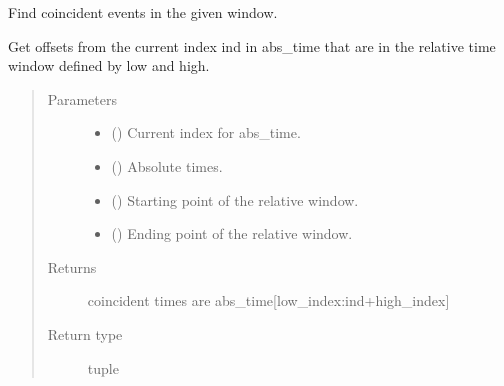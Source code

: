 \documentclass[letterpaper,10pt,english]{sphinxmanual}
\begin{document}

\begin{fulllineitems}
\label{\detokenize{tes:tes.counts.window}}
\sphinxAtStartPar
Find coincident events in the given window.

\sphinxAtStartPar
Get offsets from the current index ind in abs\_time that are in the
relative time window defined by low and high.
\begin{quote}\begin{description}
\item[{Parameters}] \leavevmode\begin{itemize}
\item {} 
\sphinxAtStartPar
{} () \textendash{} Current index for abs\_time.

\item {} 
\sphinxAtStartPar
{} () \textendash{} Absolute times.

\item {} 
\sphinxAtStartPar
{} () \textendash{} Starting point of the relative window.

\item {} 
\sphinxAtStartPar
{} () \textendash{} Ending point of the relative window.

\end{itemize}

\item[{Returns}] \leavevmode
\sphinxAtStartPar
{} \textendash{} coincident times are abs\_time{[}low\_index:ind+high\_index{]}

\item[{Return type}] \leavevmode
\sphinxAtStartPar
tuple

\end{description}\end{quote}

\end{fulllineitems}
\end{document}

